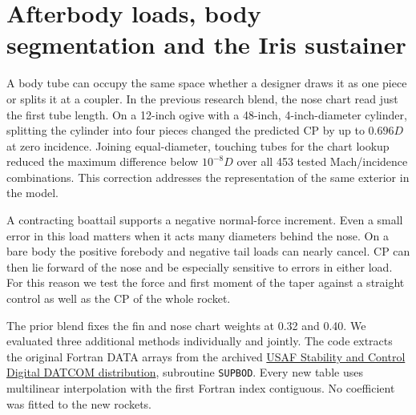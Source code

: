 \section{Afterbody loads, body segmentation and the Iris sustainer}
\label{sec:afterbody}
A body tube can occupy the same space whether a designer draws it as one piece or splits it at a coupler. In the previous research blend, the nose chart read just the first tube length. On a 12-inch ogive with a 48-inch, 4-inch-diameter cylinder, splitting the cylinder into four pieces changed the predicted CP by up to $0.696D$ at zero incidence. Joining equal-diameter, touching tubes for the chart lookup reduced the maximum difference below $10^{-8}D$ over all 453 tested Mach/incidence combinations. This correction addresses the representation of the same exterior in the model.

 A contracting boattail supports a negative normal-force increment. Even a small error in this load matters when it acts many diameters behind the nose. On a bare body the positive forebody and negative tail loads can nearly cancel. CP can then lie forward of the nose and be especially sensitive to errors in either load. For this reason we test the force and first moment of the taper against a straight control as well as the CP of the whole rocket.

 The prior blend fixes the fin and nose chart weights at 0.32 and 0.40. We evaluated three additional methods individually and jointly. The code extracts the original Fortran DATA arrays from the archived \href{https://www.pdas.com/datcomdownload.html}{USAF Stability and Control Digital DATCOM distribution}, subroutine \texttt{SUPBOD}. Every new table uses multilinear interpolation with the first Fortran index contiguous. No coefficient was fitted to the new rockets.

